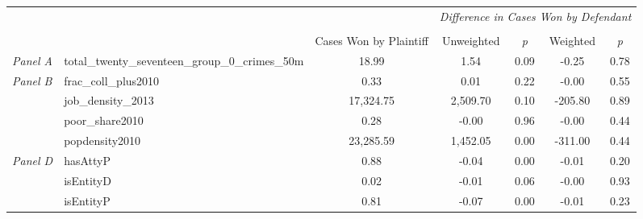 \begin{tabular}{llccccc}
\toprule
 &  & \textit{} & \multicolumn{4}{c}{\textit{Difference in Cases Won by Defendant}} \\
\cline{4-7}
\\
 &  & Cases Won by Plaintiff & Unweighted & \emph{p} & Weighted & \emph{p} \\
\midrule
\textit{Panel A} & total_twenty_seventeen_group_0_crimes_50m & 18.99 & 1.54 & 0.09 & -0.25 & 0.78 \\
\cline{1-7}
\multirow[c]{4}{3cm}{\textit{Panel B}} & frac_coll_plus2010 & 0.33 & 0.01 & 0.22 & -0.00 & 0.55 \\
 & job_density_2013 & 17,324.75 & 2,509.70 & 0.10 & -205.80 & 0.89 \\
 & poor_share2010 & 0.28 & -0.00 & 0.96 & -0.00 & 0.44 \\
 & popdensity2010 & 23,285.59 & 1,452.05 & 0.00 & -311.00 & 0.44 \\
\cline{1-7}
\multirow[c]{3}{3cm}{\textit{Panel D}} & hasAttyP & 0.88 & -0.04 & 0.00 & -0.01 & 0.20 \\
 & isEntityD & 0.02 & -0.01 & 0.06 & -0.00 & 0.93 \\
 & isEntityP & 0.81 & -0.07 & 0.00 & -0.01 & 0.23 \\
\cline{1-7}
\bottomrule
\end{tabular}
